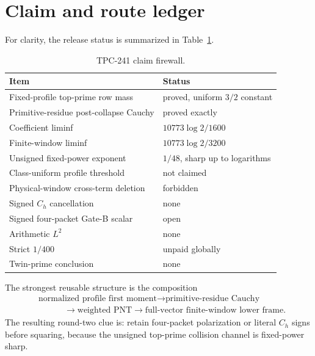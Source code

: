 \section{Claim and route ledger}

For clarity, the release status is summarized in Table~\ref{tab:ledger}.

\begin{table}[ht]
\centering
\small
\begin{tabular}{@{}ll@{}}
\toprule
Item & Status \\
\midrule
Fixed-profile top-prime row mass & proved, uniform $3/2$ constant \\
Primitive-residue post-collapse Cauchy & proved exactly \\
Coefficient liminf & $10773\log2/1600$ \\
Finite-window liminf & $10773\log2/3200$ \\
Unsigned fixed-power exponent & $1/48$, sharp up to logarithms \\
Class-uniform profile threshold & not claimed \\
Physical-window cross-term deletion & forbidden \\
Signed $C_h$ cancellation & none \\
Signed four-packet Gate-B scalar & open \\
Arithmetic $L^2$ & none \\
Strict $1/400$ & unpaid globally \\
Twin-prime conclusion & none \\
\bottomrule
\end{tabular}
\caption{TPC-241 claim firewall.}
\label{tab:ledger}
\end{table}

The strongest reusable structure is the composition
\begin{align*}
 &\text{normalized profile first moment}
 \longrightarrow \text{primitive-residue Cauchy}\\
 &\hspace{3em}\longrightarrow \text{weighted PNT}
 \longrightarrow \text{full-vector finite-window lower frame}.
\end{align*}
The resulting round-two clue is: retain four-packet polarization or literal
$C_h$ signs before squaring, because the unsigned top-prime collision channel
is fixed-power sharp.
